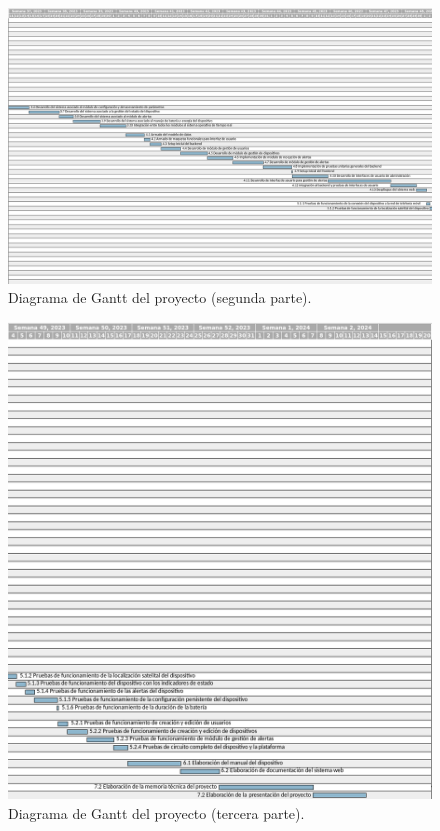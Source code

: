 \documentclass[
11pt, %
]{charter}
\begin{document}
\begin{landscape}
\begin{figure}[htpb]
\centering 
\includegraphics[width=\paperwidth]{./Figuras/Gantt2.png}
\caption{Diagrama de Gantt del proyecto (segunda parte).}
\label{fig:diagGantt2}
\end{figure}
\end{landscape}

\begin{landscape}
\begin{figure}[htpb]
\centering 
\includegraphics[height=.9\textheight]{./Figuras/Gantt3.png}
\caption{Diagrama de Gantt del proyecto (tercera parte).}
\label{fig:diagGantt3}
\end{figure}
\end{landscape}
\end{document}
